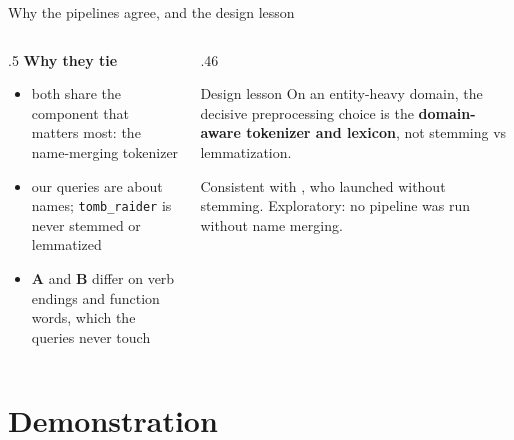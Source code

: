 \documentclass[
  aspectratio=169,
  10pt,
  t,
]{beamer}
\newcommand{\A}{\textcolor{pipeA}{\textbf{A}}}
\newcommand{\B}{\textcolor{pipeB}{\textbf{B}}}
\newcommand{\muted}[1]{\textcolor{muted}{#1}}
\begin{document}
\begin{frame}{Why the pipelines agree, and the design lesson}
\begin{columns}[T]
\begin{column}{.5\textwidth}
\textbf{Why they tie}
\begin{itemize}
  \item both share the component that matters most: the \alert{name-merging tokenizer}
  \item our queries are about names; \texttt{tomb\_raider} is never stemmed or lemmatized
  \item \A{} and \B{} differ on verb endings and function words, which the queries never touch
\end{itemize}
\end{column}
\begin{column}{.46\textwidth}
\begin{exampleblock}{Design lesson}
On an entity-heavy domain, the decisive preprocessing choice is the \textbf{domain-aware tokenizer and lexicon}, not stemming vs lemmatization.
\end{exampleblock}
\muted{\small Consistent with \textcite{brin1998anatomy}, who launched without stemming. Exploratory: no pipeline was run without name merging.}
\end{column}
\end{columns}
\end{frame}

\section{Demonstration}
\end{document}
